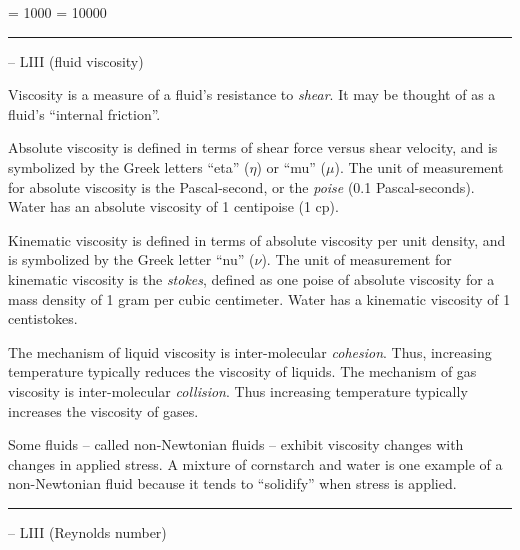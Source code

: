 



\tolerance = 1000
\pretolerance = 10000

\vskip 5pt \hrule \vskip 5pt  -- LIII (fluid viscosity) \vskip 10pt

Viscosity is a measure of a fluid's resistance to {\it shear}.  It may be thought of as a fluid's ``internal friction''.

\vskip 10pt

Absolute viscosity is defined in terms of shear force versus shear velocity, and is symbolized by the Greek letters ``eta'' ($\eta$) or ``mu'' ($\mu$).  The unit of measurement for absolute viscosity is the Pascal-second, or the {\it poise} (0.1 Pascal-seconds).  Water has an absolute viscosity of 1 centipoise (1 cp).

\vskip 10pt

Kinematic viscosity is defined in terms of absolute viscosity per unit density, and is symbolized by the Greek letter ``nu'' ($\nu$).  The unit of measurement for kinematic viscosity is the {\it stokes}, defined as one poise of absolute viscosity for a mass density of 1 gram per cubic centimeter.  Water has a kinematic viscosity of 1 centistokes.

\vskip 10pt

The mechanism of liquid viscosity is inter-molecular {\it cohesion}.  Thus, increasing temperature typically reduces the viscosity of liquids.  The mechanism of gas viscosity is inter-molecular {\it collision}.  Thus increasing temperature typically increases the viscosity of gases.

\vskip 10pt

Some fluids -- called non-Newtonian fluids -- exhibit viscosity changes with changes in applied stress.  A mixture of cornstarch and water is one example of a non-Newtonian fluid because it tends to ``solidify'' when stress is applied.


\filbreak \vskip 5pt \hrule \vskip 5pt  -- LIII (Reynolds number) \vskip 10pt

